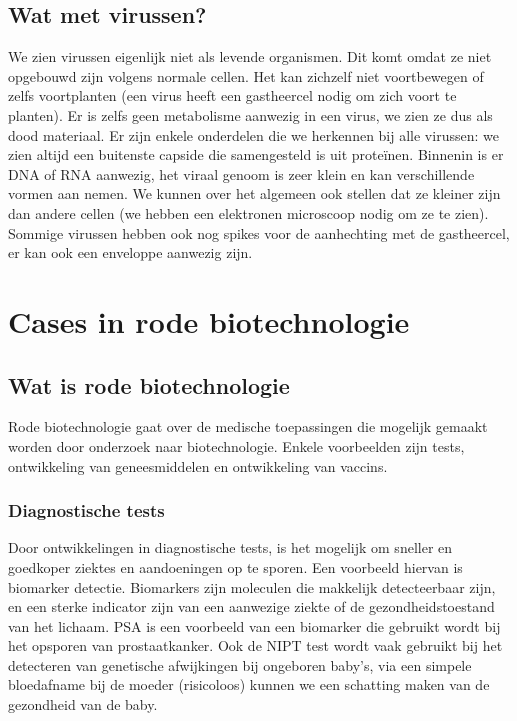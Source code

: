\documentclass[a4paper,kul]{kulakarticle} %
\begin{document}
\subsection{Wat met virussen?}
We zien virussen eigenlijk niet als levende organismen. Dit komt omdat ze niet opgebouwd zijn volgens normale cellen. Het kan zichzelf niet voortbewegen of zelfs voortplanten (een virus heeft een gastheercel nodig om zich voort te planten). Er is zelfs geen metabolisme aanwezig in een virus, we zien ze dus als dood materiaal. Er zijn enkele onderdelen die we herkennen bij alle virussen: we zien altijd een buitenste capside die samengesteld is uit proteïnen. Binnenin is er DNA of RNA aanwezig, het viraal genoom is zeer klein en kan verschillende vormen aan nemen. We kunnen over het algemeen ook stellen dat ze kleiner zijn dan andere cellen (we hebben een elektronen microscoop nodig om ze te zien). Sommige virussen hebben ook nog spikes voor de aanhechting met de gastheercel, er kan ook een enveloppe aanwezig zijn. 
\newpage
\section{Cases in rode biotechnologie}
\subsection{Wat is rode biotechnologie}
Rode biotechnologie gaat over de medische toepassingen die mogelijk gemaakt worden door onderzoek naar biotechnologie. Enkele voorbeelden zijn tests, ontwikkeling van geneesmiddelen en ontwikkeling van vaccins. 
\subsubsection{Diagnostische tests}
Door ontwikkelingen in diagnostische tests, is het mogelijk om sneller en goedkoper ziektes en aandoeningen op te sporen. Een voorbeeld hiervan is biomarker detectie. Biomarkers zijn moleculen die makkelijk detecteerbaar zijn, en een sterke indicator zijn van een aanwezige ziekte of de gezondheidstoestand van het lichaam. PSA is een voorbeeld van een biomarker die gebruikt wordt bij het opsporen van prostaatkanker. Ook de NIPT test wordt vaak gebruikt bij het detecteren van genetische afwijkingen bij ongeboren baby's, via een simpele bloedafname bij de moeder (risicoloos) kunnen we een schatting maken van de gezondheid van de baby.
\end{document}
